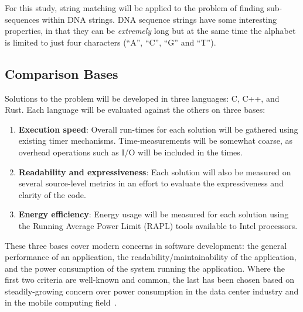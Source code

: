For this study, string matching will be applied to the problem of finding sub-sequences within DNA strings. DNA sequence strings have some interesting properties, in that they can be \textit{extremely} long but at the same time the alphabet is limited to just four characters (``A'', ``C'', ``G'' and ``T'').

\subsection{Comparison Bases}
\label{subsec:comparison}

Solutions to the problem will be developed in three languages: C, C++, and Rust. Each language will be evaluated against the others on three bases:

\begin{enumerate}
\item \textbf{Execution speed}: Overall run-times for each solution will be gathered using existing timer mechanisms. Time-measurements will be somewhat coarse, as overhead operations such as I/O will be included in the times.
\item \textbf{Readability and expressiveness}: Each solution will also be measured on several source-level metrics in an effort to evaluate the expressiveness and clarity of the code.
\item \textbf{Energy efficiency}: Energy usage will be measured for each solution using the Running Average Power Limit (RAPL) tools available to Intel processors.
\end{enumerate}

These three bases cover modern concerns in software development: the general performance of an application, the readability/maintainability of the application, and the power consumption of the system running the application. Where the first two criteria are well-known and common, the last has been chosen based on steadily-growing concern over power consumption in the data center industry and in the mobile computing field~\cite{pereira.et.al.2017}.

